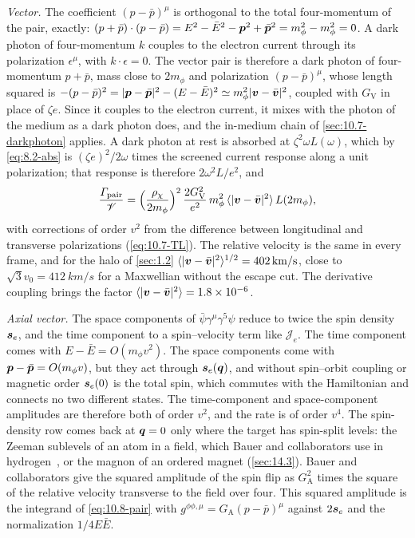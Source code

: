 \emph{Vector.} The coefficient $(p - \bar p)^\mu$ is orthogonal to the total four-momentum of the pair, exactly: $(p + \bar p)\cdot(p - \bar p) = E^2 - \bar E^2 - \bm{p}^2 + \bar{\bm{p}}^2 = m_\phi^2 - m_\phi^2 = 0$. A dark photon of four-momentum $k$ couples to the electron current through its polarization $\epsilon^\mu$, with $k\cdot\epsilon = 0$. The vector pair is therefore a dark photon of four-momentum $p + \bar p$, mass close to $2m_\phi$ and polarization $(p - \bar p)^\mu$, whose length squared is $-(p - \bar p)^2 = |\bm{p} - \bar{\bm{p}}|^2 - (E - \bar E)^2 \simeq m_\phi^2|\bm{v} - \bar{\bm{v}}|^2$, coupled with $G_{\mathrm{V}}$ in place of $\zeta e$. Since it couples to the electron current, it mixes with the photon of the medium as a dark photon does, and the in-medium chain of \cref{sec:10.7-darkphoton} applies. A dark photon at rest is absorbed at $\zeta^2\omega L(\omega)$, which by \cref{eq:8.2-abs} is $(\zeta e)^2/2\omega$ times the screened current response along a unit polarization; that response is therefore $2\omega^2L/e^2$, and
\begin{equation}
  \frac{\varGamma_{\mathrm{pair}}}{\mathscr{V}} = \Bigl(\frac{\rho_\chi}{2m_\phi}\Bigr)^2\,\frac{2G_{\mathrm{V}}^2}{e^2}\,m_\phi^2\,\langle|\bm{v} - \bar{\bm{v}}|^2\rangle\,L(2m_\phi) ,
  \label{eq:10.8-V}
\end{equation}
with corrections of order $v^2$ from the difference between longitudinal and transverse polarizations (\cref{eq:10.7-TL}). The relative velocity is the same in every frame, and for the halo of \cref{sec:1.2} $\langle|\bm{v} - \bar{\bm{v}}|^2\rangle^{1/2} = \SI{402}{km/s}$, close to $\sqrt3v_0 = \SI{412}{km/s}$ for a Maxwellian without the escape cut. The derivative coupling brings the factor $\langle|\bm{v} - \bar{\bm{v}}|^2\rangle = 1.8\times10^{-6}$.

\emph{Axial vector.} The space components of $\bar\psi\gamma^\mu\gamma^5\psi$ reduce to twice the spin density $\bm{s}_e$, and the time component to a spin--velocity term like $\mathcal{J}_e$. The time component comes with $E - \bar E = O(m_\phi v^2)$. The space components come with $\bm{p} - \bar{\bm{p}} = O(m_\phi v)$, but they act through $\bm{s}_e(\bm{q})$, and without spin--orbit coupling or magnetic order $\bm{s}_e(0)$ is the total spin, which commutes with the Hamiltonian and connects no two different states. The time-component and space-component amplitudes are therefore both of order $v^2$, and the rate is of order $v^4$. The spin-density row comes back at $\bm{q} = 0$ only where the target has spin-split levels: the Zeeman sublevels of an atom in a field, which Bauer and collaborators use in hydrogen~\cite[Eq.~(23)]{bauer2026dark}, or the magnon of an ordered magnet (\cref{sec:14.3}). Bauer and collaborators give the squared amplitude of the spin flip as $G_{\mathrm{A}}^2$ times the square of the relative velocity transverse to the field over four. This squared amplitude is the integrand of \cref{eq:10.8-pair} with $g^{\phi\phi,\mu} = G_{\mathrm{A}}(p - \bar p)^\mu$ against $2\bm{s}_e$ and the normalization $1/4E\bar E$.

